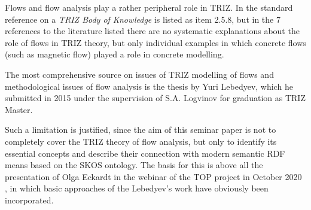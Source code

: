 \documentclass[a4paper,11pt]{article}
\begin{document}
    Flows and flow analysis play a rather peripheral role in TRIZ.  In the
    standard reference \cite{Petrov2007} on a \emph{TRIZ Body of Knowledge} is
    listed as item 2.5.8, but in the 7 references to the literature listed there
    are no systematic explanations about the role of flows in TRIZ theory, but
    only individual examples in which concrete flows (such as magnetic flow)
    played a role in concrete modelling.

    The most comprehensive source on issues of TRIZ modelling of flows and
    methodological issues of flow analysis is the thesis \cite{Lebedyev2011} by
    Yuri Lebedyev, which he submitted in 2015 under the supervision of S.A. 
    Logvinov for graduation as TRIZ Master.

    Such a limitation is justified, since the aim of this seminar paper is not to
    completely cover the TRIZ theory of flow analysis, but only to identify its
    essential concepts and describe their connection with modern semantic RDF
    means based on the SKOS ontology. The basis for this is above all the
    presentation of Olga Eckardt in the webinar of the TOP project in October 2020
    \cite{Eckardt2020}, in which basic approaches of the Lebedyev's work have
    obviously been incorporated.
\end{document}
